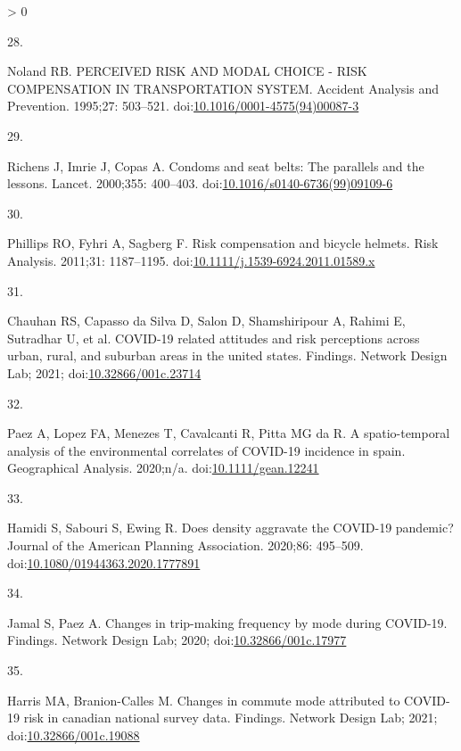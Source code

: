 \documentclass[10pt,letterpaper]{article}
\newlength{\csllabelwidth}
\newlength{\cslhangindent}
\newenvironment{CSLReferences}[3] %
 {%
  \setlength{\parindent}{0pt}
  \ifodd #1 \everypar{\setlength{\hangindent}{\cslhangindent}}\ignorespaces\fi
  \ifnum #2 > 0
  \setlength{\parskip}{#2\baselineskip}
  \fi
 }%
 {}
\newcommand{\CSLLeftMargin}[1]{\parbox[t]{\csllabelwidth}{#1}}
\newcommand{\CSLRightInline}[1]{\parbox[t]{\linewidth - \csllabelwidth}{#1}}
\begin{document}
\begin{CSLReferences}{0}{0}
\leavevmode\hypertarget{ref-Noland1995perceived}{}%
\CSLLeftMargin{28. }
\CSLRightInline{Noland RB. PERCEIVED RISK AND MODAL CHOICE - RISK
COMPENSATION IN TRANSPORTATION SYSTEM. Accident Analysis and Prevention.
1995;27: 503--521.
doi:\href{https://doi.org/10.1016/0001-4575(94)00087-3}{10.1016/0001-4575(94)00087-3}}

\leavevmode\hypertarget{ref-Richens2000condoms}{}%
\CSLLeftMargin{29. }
\CSLRightInline{Richens J, Imrie J, Copas A. Condoms and seat belts: The
parallels and the lessons. Lancet. 2000;355: 400--403.
doi:\href{https://doi.org/10.1016/s0140-6736(99)09109-6}{10.1016/s0140-6736(99)09109-6}}

\leavevmode\hypertarget{ref-Phillips2011risk}{}%
\CSLLeftMargin{30. }
\CSLRightInline{Phillips RO, Fyhri A, Sagberg F. Risk compensation and
bicycle helmets. Risk Analysis. 2011;31: 1187--1195.
doi:\href{https://doi.org/10.1111/j.1539-6924.2011.01589.x}{10.1111/j.1539-6924.2011.01589.x}}

\leavevmode\hypertarget{ref-Chauhan2021covid}{}%
\CSLLeftMargin{31. }
\CSLRightInline{Chauhan RS, Capasso da Silva D, Salon D, Shamshiripour
A, Rahimi E, Sutradhar U, et al. COVID-19 related attitudes and risk
perceptions across urban, rural, and suburban areas in the united
states. Findings. Network Design Lab; 2021;
doi:\href{https://doi.org/10.32866/001c.23714}{10.32866/001c.23714}}

\leavevmode\hypertarget{ref-Paez2020spatio}{}%
\CSLLeftMargin{32. }
\CSLRightInline{Paez A, Lopez FA, Menezes T, Cavalcanti R, Pitta MG da
R. A spatio-temporal analysis of the environmental correlates of
COVID-19 incidence in spain. Geographical Analysis. 2020;n/a.
doi:\href{https://doi.org/10.1111/gean.12241}{10.1111/gean.12241}}

\leavevmode\hypertarget{ref-Hamidi2020density}{}%
\CSLLeftMargin{33. }
\CSLRightInline{Hamidi S, Sabouri S, Ewing R. Does density aggravate the
COVID-19 pandemic? Journal of the American Planning Association.
2020;86: 495--509.
doi:\href{https://doi.org/10.1080/01944363.2020.1777891}{10.1080/01944363.2020.1777891}}

\leavevmode\hypertarget{ref-Jamal2020Changes}{}%
\CSLLeftMargin{34. }
\CSLRightInline{Jamal S, Paez A. Changes in trip-making frequency by
mode during COVID-19. Findings. Network Design Lab; 2020;
doi:\href{https://doi.org/10.32866/001c.17977}{10.32866/001c.17977}}

\leavevmode\hypertarget{ref-Harris2021Changes}{}%
\CSLLeftMargin{35. }
\CSLRightInline{Harris MA, Branion-Calles M. Changes in commute mode
attributed to COVID-19 risk in canadian national survey data. Findings.
Network Design Lab; 2021;
doi:\href{https://doi.org/10.32866/001c.19088}{10.32866/001c.19088}}


\end{CSLReferences}
\end{document}
